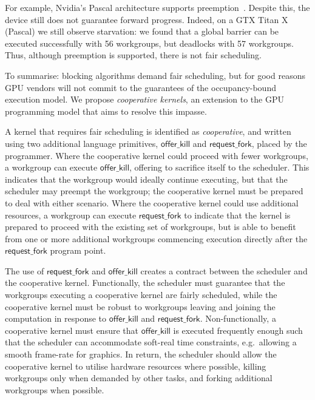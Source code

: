 \documentclass[sigconf]{acmart}
\newcommand{\offerfork}{\mathsf{request\_fork}}
\newcommand{\offerkill}{\mathsf{offer\_kill}}
\begin{document}
For example, Nvidia's Pascal architecture supports
preemption~\cite{PascalWhitepaper}. Despite this, the device still
does not guarantee forward progress. Indeed, on a GTX Titan X (Pascal)
we still observe starvation: we found that a global barrier can be
executed successfully with 56 workgroups, but deadlocks with 57
workgroups.  Thus, although preemption is supported, there is not fair
scheduling.

%
To summarise: blocking algorithms
demand fair scheduling,
but for good reasons
GPU vendors will not commit to the guarantees of the
occupancy-bound execution model.
%
We propose \emph{cooperative kernels}, an extension to the GPU
programming model that aims to resolve this impasse.

A kernel
that requires fair scheduling is identified as \emph{cooperative}, and written using two additional
language primitives, $\offerkill$ and $\offerfork$, placed by the programmer.
%
Where the cooperative kernel could proceed with fewer
workgroups, a workgroup can execute $\offerkill$, offering to
sacrifice itself to the scheduler.  This indicates that the workgroup
would ideally continue executing, but that the
scheduler may preempt the workgroup; the cooperative kernel
must be prepared to deal with either scenario.
%
Where the cooperative kernel could use additional resources, a workgroup can execute
$\offerfork$ to indicate that the
kernel is prepared to proceed with the existing set of workgroups, but
is able to benefit from one or more additional workgroups
commencing execution directly after the $\offerfork$ program point.

The use of $\offerfork$ and $\offerkill$ creates a contract between
the scheduler and the cooperative kernel.  Functionally, the scheduler
must guarantee that the workgroups executing a cooperative kernel are
fairly scheduled, while the cooperative kernel must be robust to
workgroups leaving and joining the computation in response to
$\offerkill$ and $\offerfork$.  Non-functionally, a cooperative kernel
must ensure that $\offerkill$ is executed frequently enough such that
the scheduler can accommodate soft-real time constraints,
e.g.\ allowing a smooth frame-rate for graphics.
In return, the scheduler should allow the cooperative kernel to
utilise hardware resources where possible, killing workgroups only
when demanded by other tasks, and forking additional workgroups when
possible. 
\end{document}
